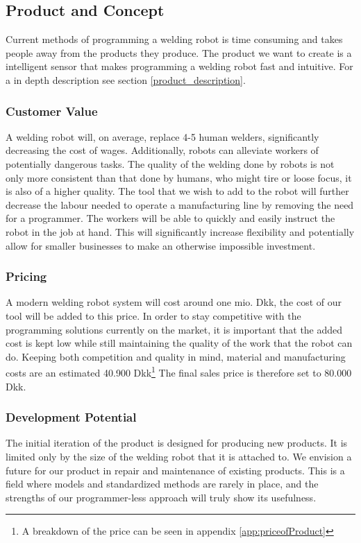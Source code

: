 \subsection{Product and Concept}
Current methods of programming a welding robot is time consuming and takes people away from the products they produce.
The product we want to create is a intelligent sensor that makes programming a welding robot fast and intuitive. 
For a in depth description see section \ref{product_description}.

\subsubsection{Customer Value}
A welding robot will, on average, replace 4-5 human welders, significantly decreasing the cost of wages. Additionally, robots can alleviate workers of potentially dangerous tasks. The quality of the welding done by robots is not only more consistent than that done by humans, who might tire or loose focus, it is also of a higher quality. The tool that we wish to add to the robot will further decrease the labour needed to operate a manufacturing line by removing the need for a programmer. The workers will be able to quickly and easily instruct the robot in the job at hand. This will significantly increase flexibility and potentially allow for smaller businesses to make an otherwise impossible investment.

\subsubsection{Pricing}
A modern welding robot system will cost around one mio. Dkk, the cost of our tool will be added to this price. In order to stay competitive with the programming solutions currently on the market, it is important that the added cost is kept low while still maintaining the quality of the work that the robot can do. Keeping both competition and quality in mind, material and manufacturing costs are an estimated 40.900 Dkk\footnote{A breakdown of the price can be seen in appendix \ref{app:priceofProduct}} 
The final sales price is therefore set to 80.000 Dkk.

\subsubsection{Development Potential}
The initial iteration of the product is designed for producing new products. It is limited only by the size of the welding robot that it is attached to. We envision a future for our product in repair and maintenance of existing products. This is a field where models and standardized methods are rarely in place, and the strengths of our programmer-less approach will truly show its usefulness.

